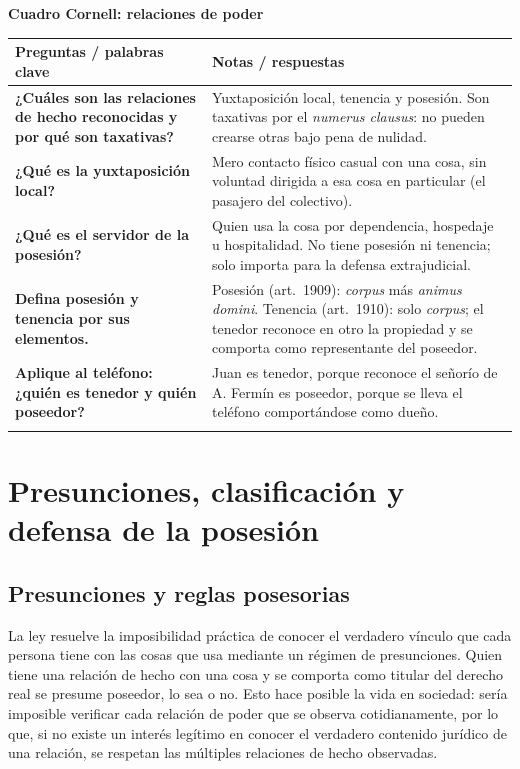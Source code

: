 \documentclass[12pt,oneside]{book}
\renewcommand{\arraystretch}{1.25}
\newcommand{\cq}[2]{\textbf{#1} & #2 \\[0.45em]}
\newcommand{\cornell}[3]{%
\par\bigskip\noindent\textbf{\large Cuadro Cornell: #1}\par\smallskip
\begin{center}
\small
\renewcommand{\arraystretch}{1.15}
\begin{tabularx}{\textwidth}{>{\raggedright\arraybackslash}p{0.27\textwidth}>{\raggedright\arraybackslash}X}
\toprule
\textbf{Preguntas / palabras clave} & \textbf{Notas / respuestas} \\
\midrule
#2
\midrule
\multicolumn{2}{p{\dimexpr\textwidth-2\tabcolsep\relax}}{\textbf{Resumen.} #3} \\
\bottomrule
\end{tabularx}
\end{center}
}
\begin{document}
\cornell{relaciones de poder}{
\cq{¿Cuáles son las relaciones de hecho reconocidas y por qué son taxativas?}{Yuxtaposición local, tenencia y posesión. Son taxativas por el \textit{numerus clausus}: no pueden crearse otras bajo pena de nulidad.}
\cq{¿Qué es la yuxtaposición local?}{Mero contacto físico casual con una cosa, sin voluntad dirigida a esa cosa en particular (el pasajero del colectivo).}
\cq{¿Qué es el servidor de la posesión?}{Quien usa la cosa por dependencia, hospedaje u hospitalidad. No tiene posesión ni tenencia; solo importa para la defensa extrajudicial.}
\cq{Defina posesión y tenencia por sus elementos.}{Posesión (art.~1909): \textit{corpus} más \textit{animus domini}. Tenencia (art.~1910): solo \textit{corpus}; el tenedor reconoce en otro la propiedad y se comporta como representante del poseedor.}
\cq{Aplique al teléfono: ¿quién es tenedor y quién poseedor?}{Juan es tenedor, porque reconoce el señorío de A. Fermín es poseedor, porque se lleva el teléfono comportándose como dueño.}
}{Las relaciones de poder reconocidas son taxativas. La posesión exige \textit{corpus} y \textit{animus domini}; la tenencia, solo \textit{corpus}, reconociendo en otro la propiedad; el servidor de la posesión usa la cosa por dependencia, hospedaje u hospitalidad y solo interesa para la defensa extrajudicial.}

\chapter[Presunciones, clasificación y defensa de la posesión]{Presunciones, clasificación y defensa de la posesión}\label{cap:clasificacion}

\section{Presunciones y reglas posesorias}

La ley resuelve la imposibilidad práctica de conocer el verdadero vínculo que cada persona tiene con las cosas que usa mediante un régimen de presunciones. Quien tiene una relación de hecho con una cosa y se comporta como titular del derecho real se presume poseedor, lo sea o no. Esto hace posible la vida en sociedad: sería imposible verificar cada relación de poder que se observa cotidianamente, por lo que, si no existe un interés legítimo en conocer el verdadero contenido jurídico de una relación, se respetan las múltiples relaciones de hecho observadas.
\end{document}
